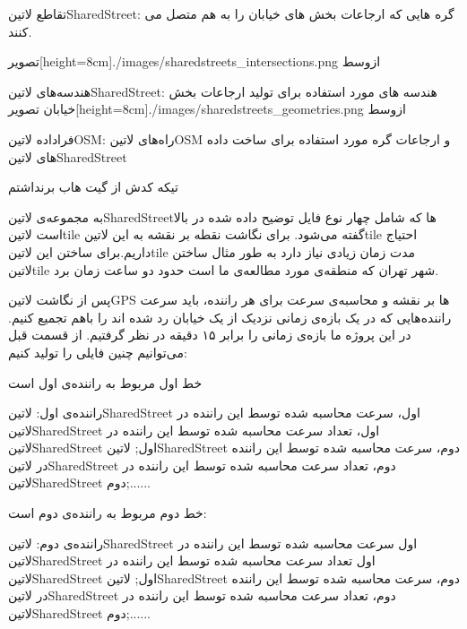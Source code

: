  تقاطع ‌لاتین{SharedStreet}: گره هایی که ارجاعات بخش های خیابان را به هم متصل می کنند.


  ‌تصویر[height=8cm]{./images/sharedstreets_intersections.png}
  ‌ازوسط


 هندسه‌های ‌لاتین{SharedStreet}: هندسه های مورد استفاده برای تولید ارجاعات بخش خیابان
  ‌تصویر[height=8cm]{./images/sharedstreets_geometries.png}
  ‌ازوسط


 فراداده ‌لاتین{OSM}: راه‌های ‌لاتین{OSM} و ارجاعات گره مورد استفاده برای ساخت داده های  لاتین{SharedStreet}


تیکه کدش از گیت هاب برنداشتم

به مجموعه‌ی ‌لاتین{SharedStreet}ها که شامل چهار نوع فایل توضیح داده شده در بالا است  لاتین{tile} گفته می‌شود. برای نگاشت نقطه بر نقشه به این  لاتین{tile} احتیاج داریم.برای ساختن این  لاتین{tile} مدت زمان زیادی نیاز دارد به طور مثال ساختن  لاتین{tile} شهر تهران که منطقه‌ی مورد مطالعه‌ی ما است حدود دو ساعت زمان برد.


پس از نگاشت ‌لاتین{GPS} ها بر نقشه و محاسبه‌ی سرعت برای هر راننده، باید سرعت راننده‌هایی که در یک بازه‌ی زمانی نزدیک از یک خیابان رد شده اند را باهم تجمیع کنیم. در این پروژه ما بازه‌ی زمانی را برابر ۱۵ دقیقه در نظر گرفتیم. از قسمت قبل می‌توانیم چنین فایلی را تولید کنیم:

خط اول مربوط به راننده‌ی اول است

راننده‌ی اول: ‌لاتین{SharedStreet} اول، سرعت محاسبه شده توسط این راننده در  لاتین{SharedStreet} اول، تعداد سرعت محاسبه شده توسط این راننده در  لاتین{SharedStreet} اول;   لاتین{SharedStreet} دوم، سرعت محاسبه شده توسط این راننده در  لاتین{SharedStreet} دوم، تعداد سرعت محاسبه شده توسط این راننده در  لاتین{SharedStreet} دوم;......


خط دوم مربوط به راننده‌ی دوم است:

راننده‌ی دوم: ‌لاتین{SharedStreet} اول سرعت محاسبه شده توسط این راننده در  لاتین{SharedStreet} اول تعداد سرعت محاسبه شده توسط این راننده در  لاتین{SharedStreet} اول;   لاتین{SharedStreet} دوم، سرعت محاسبه شده توسط این راننده در  لاتین{SharedStreet} دوم، تعداد سرعت محاسبه شده توسط این راننده در  لاتین{SharedStreet} دوم;......

